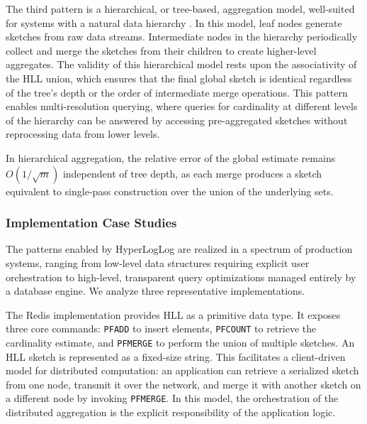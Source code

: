 The third pattern is a hierarchical, or tree-based, aggregation model, well-suited for systems with a natural data hierarchy \cite{Wilms2021TreebasedNA}. In this model, leaf nodes generate sketches from raw data streams. Intermediate nodes in the hierarchy periodically collect and merge the sketches from their children to create higher-level aggregates. The validity of this hierarchical model rests upon the associativity of the HLL union, which ensures that the final global sketch is identical regardless of the tree's depth or the order of intermediate merge operations. This pattern enables multi-resolution querying, where queries for cardinality at different levels of the hierarchy can be answered by accessing pre-aggregated sketches without reprocessing data from lower levels.

\begin{remark}
    In hierarchical aggregation, the relative error of the global estimate remains $O(1/\sqrt{m})$ independent of tree depth, as each merge produces a sketch equivalent to single-pass construction over the union of the underlying sets.
\end{remark}


\subsubsection{Implementation Case Studies}

The patterns enabled by HyperLogLog are realized in a spectrum of production systems, ranging from low-level data structures requiring explicit user orchestration to high-level, transparent query optimizations managed entirely by a database engine. We analyze three representative implementations.

The Redis implementation \cite{redis-hll} provides HLL as a primitive data type. It exposes three core commands: \texttt{PFADD} to insert elements, \texttt{PFCOUNT} to retrieve the cardinality estimate, and \texttt{PFMERGE} to perform the union of multiple sketches. An HLL sketch is represented as a fixed-size string. This facilitates a client-driven model for distributed computation: an application can retrieve a serialized sketch from one node, transmit it over the network, and merge it with another sketch on a different node by invoking \texttt{PFMERGE}. In this model, the orchestration of the distributed aggregation is the explicit responsibility of the application logic.


